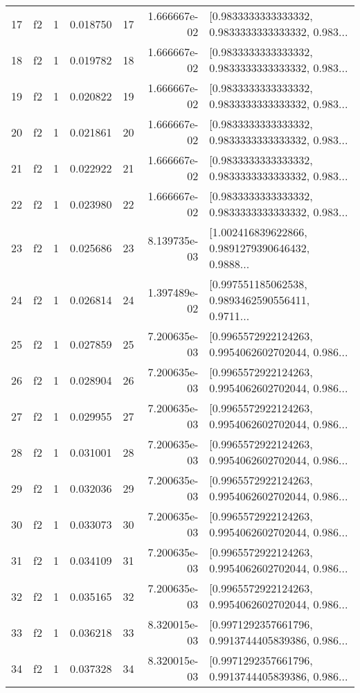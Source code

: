 \begin{tabular}{lllrlrl}
17  &  f2 &   1 &  0.018750 &   17 &  1.666667e-02 &  [0.9833333333333332, 0.9833333333333332, 0.983... \\
18  &  f2 &   1 &  0.019782 &   18 &  1.666667e-02 &  [0.9833333333333332, 0.9833333333333332, 0.983... \\
19  &  f2 &   1 &  0.020822 &   19 &  1.666667e-02 &  [0.9833333333333332, 0.9833333333333332, 0.983... \\
20  &  f2 &   1 &  0.021861 &   20 &  1.666667e-02 &  [0.9833333333333332, 0.9833333333333332, 0.983... \\
21  &  f2 &   1 &  0.022922 &   21 &  1.666667e-02 &  [0.9833333333333332, 0.9833333333333332, 0.983... \\
22  &  f2 &   1 &  0.023980 &   22 &  1.666667e-02 &  [0.9833333333333332, 0.9833333333333332, 0.983... \\
23  &  f2 &   1 &  0.025686 &   23 &  8.139735e-03 &  [1.002416839622866, 0.9891279390646432, 0.9888... \\
24  &  f2 &   1 &  0.026814 &   24 &  1.397489e-02 &  [0.997551185062538, 0.9893462590556411, 0.9711... \\
25  &  f2 &   1 &  0.027859 &   25 &  7.200635e-03 &  [0.9965572922124263, 0.9954062602702044, 0.986... \\
26  &  f2 &   1 &  0.028904 &   26 &  7.200635e-03 &  [0.9965572922124263, 0.9954062602702044, 0.986... \\
27  &  f2 &   1 &  0.029955 &   27 &  7.200635e-03 &  [0.9965572922124263, 0.9954062602702044, 0.986... \\
28  &  f2 &   1 &  0.031001 &   28 &  7.200635e-03 &  [0.9965572922124263, 0.9954062602702044, 0.986... \\
29  &  f2 &   1 &  0.032036 &   29 &  7.200635e-03 &  [0.9965572922124263, 0.9954062602702044, 0.986... \\
30  &  f2 &   1 &  0.033073 &   30 &  7.200635e-03 &  [0.9965572922124263, 0.9954062602702044, 0.986... \\
31  &  f2 &   1 &  0.034109 &   31 &  7.200635e-03 &  [0.9965572922124263, 0.9954062602702044, 0.986... \\
32  &  f2 &   1 &  0.035165 &   32 &  7.200635e-03 &  [0.9965572922124263, 0.9954062602702044, 0.986... \\
33  &  f2 &   1 &  0.036218 &   33 &  8.320015e-03 &  [0.9971292357661796, 0.9913744405839386, 0.986... \\
34  &  f2 &   1 &  0.037328 &   34 &  8.320015e-03 &  [0.9971292357661796, 0.9913744405839386, 0.986... \\

\end{tabular}
